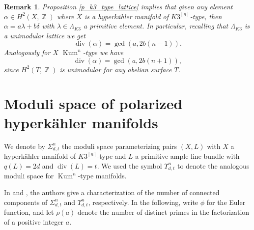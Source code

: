 \documentclass{article}
\DeclareMathOperator{\bZ}{\mathbb{Z}}
\DeclareMathOperator{\Kum}{Kum}
\DeclareMathOperator{\Div}{div}
\newcommand{\hilb}[2][n]{#2^{[#1]}}
\newtheorem{remark}[proposition]{Remark}
\begin{document}
\begin{remark}\label{remark_how_to_compute_divisibility}
Proposition \ref{p_k3_type_lattice} implies that given any element $\alpha\in H^2(X,\bZ)$ where $X$ is a hyperk\"ahler manifold of $\hilb[n]{K3}$-type, then $\alpha=a\lambda+b\delta$ with $\lambda\in \Lambda_{K3}$ a primitive element. In particular, recalling that $\Lambda_{K3}$ is a unimodular lattice we get $$\Div(\alpha)=\gcd(a,2b(n-1)).$$ 
Analogously for $X$ $\Kum^n$-type we have $$\Div(\alpha)=\gcd(a,2b(n+1)),$$
since $H^2(T,\bZ)$ is unimodular for any abelian surface $T$.
\end{remark}





\section{Moduli space of polarized hyperk\"ahler manifolds}\label{sect_moduli}
We denote by $\Sigma_{d,t}^n$ the moduli space parameterizing pairs $(X,L)$ with $X$ a hyperk\"ahler manifold of $\hilb{K3}$-type and $L$ a primitive ample line bundle with $q(L)=2d$ and $\Div(L)=t$. We used the symbol $\Upsilon_{d,t}^n$ to denote the analogous moduli space for $\Kum^n$-type manifolds.

In \cite{zbMATH06387271} and \cite{onorati2022connectedcomponentsmodulispaces}, the authors give a characterization of the number of connected components of $\Sigma_{d,t}^n$ and $\Upsilon_{d,t}^n$, respectively. In the following, write $\phi$ for the Euler function, and let $\rho(a)$ denote the number of distinct primes in the factorization of a positive integer $a$.
\end{document}
